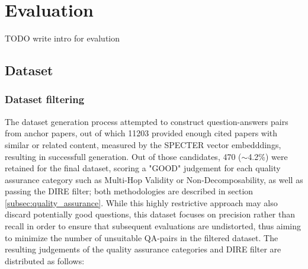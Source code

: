 \chapter{Evaluation}
\label{cha:Evaluation}
TODO write intro for evalution
\section{Dataset}
\subsection{Dataset filtering}
The dataset generation process attempted to construct question-answers pairs from 
anchor papers, out of which 11203 provided enough cited papers with similar or related content, measured by the SPECTER vector embedddings, resulting in successfull generation. 
Out of those candidates, 470 ($\sim$4.2\%) were retained for the final dataset, scoring a "GOOD" judgement for each quality assurance category such as Multi-Hop Validity or Non-Decomposability, as well as passing the DIRE filter; both methodologies are described in section \ref{subsec:quality_assurance}. While this highly restrictive approach may also discard potentially good questions, this dataset focuses on precision rather than recall in order to ensure that subsequent evaluations are undistorted, thus aiming to minimize the number of unsuitable QA-pairs in the filtered dataset. The resulting judgements of the quality assurance categories and DIRE filter are distributed as follows:


